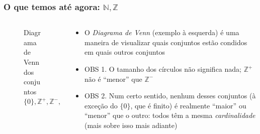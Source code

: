 \documentclass[usenames,dvipsnames,svgnames]{beamer}
\begin{document}
\begin{frame}	
	\frametitle{O que temos até agora: $\mathbb{N}, \mathbb{Z}$}

	\begin{columns}[t]
	\begin{column}{.4\textwidth}
		\begin{figure}
			\def\Zcircle{		(0,0) 			circle (2.5cm)}
			\def\Ncircle{		(1.25cm:-1.25cm) circle (1.1cm)}
			\def\Zminuscircle{	(1.25cm:1.25cm) circle (1.1cm)}
			\def\Zpluscircle{	(1cm:-1.75cm) circle (0.5cm)}
			\def\zerocircle{	(1.5cm:-0.75cm) circle (0.5cm)}

			\caption{Diagrama de Venn dos conjuntos $\{0\}, \mathbb{Z}^{+}, \mathbb{Z}^{-}, \mathbb{N}, \mathbb{Z}$}
		\end{figure}
	\end{column}
	\begin{column}{.6\textwidth}
		\begin{itemize}
		\item O \emph{Diagrama de Venn} (exemplo à esquerda) é uma maneira de visualizar quais conjuntos {\color{red} estão condidos em} quais outros conjuntos
		\item OBS 1. O tamanho dos círculos não significa nada; $\mathbb{Z}^{+}$ não é ``menor'' que $\mathbb{Z}^{-}$
		\item OBS 2. Num certo sentido, nenhum desses conjuntos (à exceção do $\{0\}$, que é finito) é realmente ``maior'' ou ``menor'' que o outro: todos têm a mesma \emph{cardinalidade} (mais sobre isso mais adiante)
		\end{itemize}
	\end{column}
	\end{columns}
\end{frame}
\end{document}
